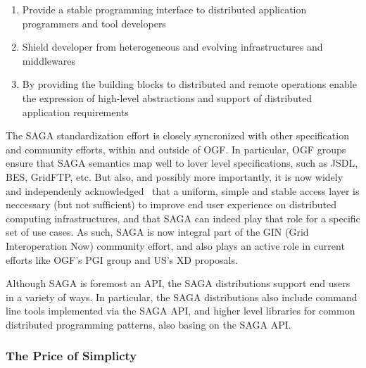 \documentclass[10pt,conference,final,letterpaper,twoside,twocolumn,]{IEEEtran}
\begin{document}
 \begin{enumerate}

  \item Provide a stable programming interface to distributed
  application programmers and tool developers
 
  \item Shield developer from heterogeneous and evolving
  infrastructures and middlewares

  \item By providing the building blocks to distributed and remote
  operations enable the expression of high-level abstractions and
  support of distributed application requirements

 \end{enumerate}

 The SAGA standardization effort is closely syncronized with other
 specification and community efforts, within and outside of OGF.  In
 particular, OGF groups ensure that SAGA semantics map well to lover
 level specifications, such as JSDL, BES, GridFTP, etc.   But also,
 and possibly more importantly, it is now widely and independenly
 acknowledged~\cite{XD,EGI,UMD,Naregi} that a uniform, simple and
 stable access layer is neccessary (but not sufficient) to improve end
 user experience on distributed computing infrastructures, and that
 SAGA can indeed play that role for a specific set of use cases.  As
 such, SAGA is now integral part of the GIN (Grid Interoperation Now)
 community effort, and also plays an active role in current efforts
 like OGF's PGI group and US's XD proposals.
  
 Although SAGA is foremost an API, the SAGA distributions support end
 users in a variety of ways.  In particular, the SAGA distributions
 also include command line tools implemented via the SAGA API, and
 higher level libraries for common distributed programming patterns,
 also basing on the SAGA API.


 \subsubsection*{The Price of Simplicty\cite{sagaprice}}
\end{document}
